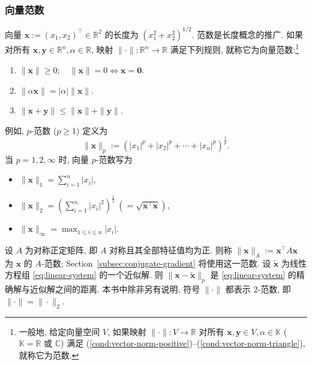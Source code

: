 \subsubsection{{向量范数}}\label{subsec:vector-norm}
{向量 $\bm x:=(x_1,x_2)^\top\in\mathbb R^2$ 的长度为 $(x_1^2+x_2^2)^{1/2}$. 范数是长度概念的推广. 如果对所有 $\bm x,\bm y\in\mathbb R^n,\alpha\in\mathbb R$, 映射 $\|\cdot\|:\mathbb R^n\to\mathbb R$ 满足下列规则, 就称它为向量范数:\footnote{一般地, 给定向量空间 $V$, 如果映射 $\|\cdot\|:V\to\mathbb R$ 对所有 $\bm x,\bm y\in V,\alpha\in\mathbb K$ ($\mathbb K=\mathbb R$ 或 $\mathbb C$) 满足 (\ref{cond:vector-norm-positive})--(\ref{cond:vector-norm-triangle}), 就称它为范数.}}
\begin{enumerate}[label=(Nv\arabic*),ref=Nv\arabic*]
\item\label{cond:vector-norm-positive} $\|\bm x\|\ge0;\quad\|\bm x\|=0\iff\bm x=\bm0$.
\item\label{cond:vector-norm-homogeneous} $\|\alpha\bm x\|=|\alpha|\|\bm x\|$.
\item\label{cond:vector-norm-triangle} $\|\bm x+\bm y\|\le\|\bm x\|+\|\bm y\|$.
\end{enumerate}
{例如, $p$-范数 ($p\ge1$) 定义为}
\[
\|\bm x\|_p:=(|x_1|^p+|x_2|^p+\cdots+|x_n|^p)^{\frac1p}.
\]
{当 $p=1,2,\infty$ 时, 向量 $p$-范数写为}
\begin{itemize}
\item $\|\bm x\|_1=\sum_{i=1}^n|x_i|$,
\item $\|\bm x\|_2=(\sum_{i=1}^n|x_i|^2)^{\frac12}\ (=\sqrt{\bm x^\top\bm x})$,
\item $\|\bm x\|_\infty=\max_{1\le i\le n}|x_i|$.
\end{itemize}
{设 $A$ 为对称正定矩阵, 即 $A$ 对称且其全部特征值均为正. 则称 $\|\bm x\|_A:=\bm x^\top A\bm x$ 为 $\bm x$ 的 $A$-范数; Section~\ref{subsec:conjugate-gradient} 将使用这一范数.}
{设 $\tilde{\bm x}$ 为线性方程组 \eqref{eq:linear-system} 的一个近似解. 则 $\|\bm x-\tilde{\bm x}\|_p$ 是 \eqref{eq:linear-system} 的精确解与近似解之间的距离.}
{本书中除非另有说明, 符号 $\|\cdot\|$ 都表示 2-范数, 即 $\|\cdot\|=\|\cdot\|_2$.}
